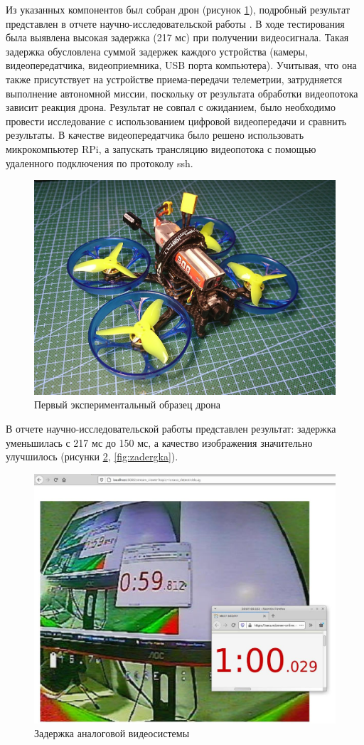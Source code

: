 Из указанных компонентов был собран дрон (рисунок \ref{fig:drone}), подробный результат представлен в отчете научно-исследовательской работы \cite{nir1}. В ходе тестирования была выявлена высокая задержка (217 мс) при получении видеосигнала. Такая задержка обусловлена суммой задержек каждого устройства (камеры, видеопередатчика, видеоприемника, USB порта компьютера). Учитывая, что она также присутствует на устройстве приема-передачи телеметрии, затрудняется выполнение автономной миссии, поскольку от результата обработки видеопотока зависит реакция дрона. Результат не совпал с ожиданием, было необходимо провести исследование с использованием цифровой видеопередачи и сравнить результаты. В качестве видеопередатчика было решено использовать микрокомпьютер RPi, а запускать трансляцию видеопотока с помощью удаленного подключения по протоколу ssh.

\begin{figure}[H]
	\centering
	\includegraphics[width=0.5\linewidth]{../RW/pics/quad2}
	\caption{Первый экспериментальный образец дрона
	}
	\label{fig:drone} %
\end{figure}

В отчете научно-исследовательской работы \cite{nir2} представлен результат: задержка уменьшилась с 217 мс до 150 мс, а качество изображения значительно улучшилось (рисунки \ref{fig:time}, \ref{fig:zadergka}).

\begin{figure}[H]
	\centering
	\includegraphics[width=0.5\linewidth]{../RW/pics/time}
	\caption{Задержка аналоговой видеосистемы
	}
	\label{fig:time} %
\end{figure}

